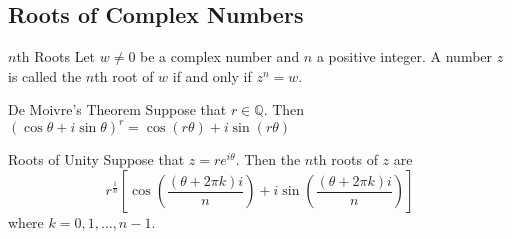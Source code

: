 \documentclass[a4paper]{article}
\begin{document}
\subsection{Roots of Complex Numbers}
\begin{defn}{$n$th Roots}{} Let $w\neq0$ be a complex number and $n$ a positive integer. A number $z$ is called the $n$th root of $w$ if and only if $z^n=w$. 
\end{defn}

\begin{thm}{De Moivre's Theorem}{} Suppose that $r\in\mathbb{Q}$. Then $(\cos{\theta}+i\sin{\theta})^r=\cos{(r\theta)}+i\sin{(r\theta)}$
\end{thm}

\begin{thm}{Roots of Unity}{} Suppose that $z=re^{i\theta}$. Then the $n$th roots of $z$ are $$r^{\frac{1}{n}}\left[\cos{\left(\frac{(\theta+2\pi k)i}{n}\right)}+i\sin{\left(\frac{(\theta+2\pi k)i}{n}\right)}\right]$$ where $k=0,1,\dots,n-1$. 
\end{thm}
\end{document}
